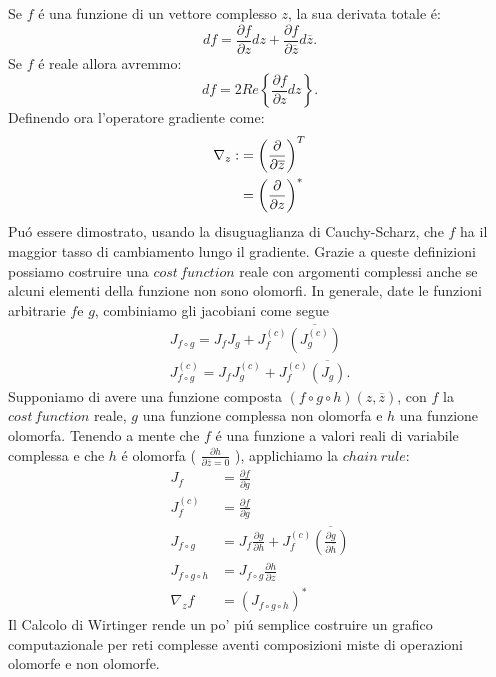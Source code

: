 \documentclass[a4paper,12pt]{report}
\begin{document}
 Se $f$ \'e una funzione di un vettore complesso $z$, la sua derivata totale \'e:
 \begin{equation}
  df=\frac{\partial f}{\partial z}dz+\frac{\partial f}{\partial \overline{z}}d\overline{z}.
 \end{equation}
 Se $f$ \'e reale allora avremmo:
 \begin{equation}
  df=2Re\left \{ \frac{\partial f}{\partial z} dz \right \}.
 \end{equation}
 Definendo ora l'operatore gradiente come:
 \begin{align}
  \nabla_z :&= \left(\frac{\partial}{\partial\overline{z}}\right)^T\\
  &=\left(\frac{\partial}{\partial z}\right)^* \notag
 \end{align}
 Pu\'o essere dimostrato, usando la disuguaglianza di Cauchy-Scharz, che $f$ ha il maggior tasso di cambiamento lungo il gradiente. Grazie a queste definizioni possiamo costruire una $cost \, function$ reale con argomenti complessi anche se alcuni elementi della funzione non sono olomorfi. 
 In generale, date le funzioni arbitrarie $f$e $g$, combiniamo gli jacobiani come segue
 \begin{align}
  J_{f\circ g} = J_f J_g + J_f^{\left(c\right)}\overline{\left(J_g^{\left(c\right)}\right)}\\
  J_{f\circ g}^{\left(c\right)} = J_f J_g^{\left(c\right)} + J_f^{\left(c\right)}\overline{\left(J_g\right)}.
 \end{align}
 Supponiamo di avere una funzione composta $\left(f\circ g\circ h\right)\left(z,\overline{z}\right)$, con $f$ la $cost \, function$ reale, $g$ una funzione complessa non olomorfa e $h$ una funzione olomorfa. 
 Tenendo a mente che $f$ \'e una funzione a valori reali di variabile complessa e che $h$ \'e olomorfa ( $\frac{\partial h}{\partial \overline{z} = 0}$ ), applichiamo la $chain \ rule$:
 \begin{align}
  J_f &= \frac{ \partial f}{ \partial g}\\
  J_f^{\left( c\right)} &= \frac{\partial f}{\partial \overline{g}}\\
  J_{f\circ g} &= J_f \frac{\partial g}{\partial h} + J_f^{\left( c\right)} \overline{\left( \frac{\partial g}{\partial \overline{h}}\right) }\\
  J_{f\circ g\circ h} &= J_{f\circ g} \frac{\partial h}{\partial z}\\
  \nabla_z f &= \left( J_{f\circ g\circ h}\right)^*
 \end{align}
 Il Calcolo di Wirtinger rende un po' pi\'u semplice costruire un grafico computazionale per reti complesse aventi composizioni miste di operazioni olomorfe e non olomorfe.
 
\end{document}
